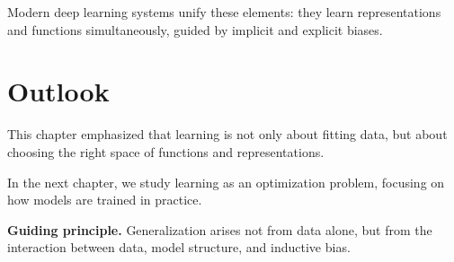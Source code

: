 Modern deep learning systems unify these elements: they learn representations and functions simultaneously, guided by implicit and explicit biases.

\section{Outlook}

This chapter emphasized that learning is not only about fitting data, but about choosing the right space of functions and representations.

\medskip

In the next chapter, we study learning as an optimization problem, focusing on how models are trained in practice.

\medskip

\noindent
\textbf{Guiding principle.}  
Generalization arises not from data alone, but from the interaction between data, model structure, and inductive bias.
